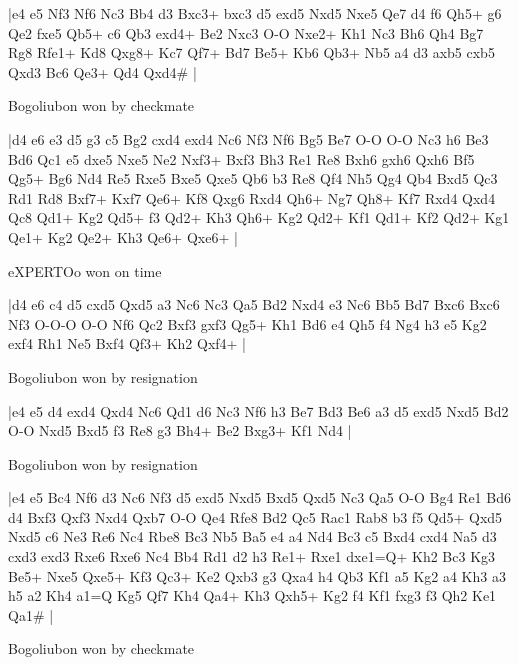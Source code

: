 \makegametitle
|e4 e5 Nf3 Nf6 Nc3 Bb4 d3 Bxc3+ bxc3 d5 exd5 Nxd5 Nxe5 Qe7 d4 f6 Qh5+ g6 Qe2 fxe5 Qb5+ c6 Qb3 exd4+ Be2 Nxc3 O-O Nxe2+ Kh1 Nc3 Bh6 Qh4 Bg7 Rg8 Rfe1+ Kd8 Qxg8+ Kc7 Qf7+ Bd7 Be5+ Kb6 Qb3+ Nb5 a4 d3 axb5 cxb5 Qxd3 Bc6 Qe3+ Qd4 Qxd4\#  |

\showboard

Bogoliubon won by checkmate

\makegametitle
|d4 e6 e3 d5 g3 c5 Bg2 cxd4 exd4 Nc6 Nf3 Nf6 Bg5 Be7 O-O O-O Nc3 h6 Be3 Bd6 Qc1 e5 dxe5 Nxe5 Ne2 Nxf3+ Bxf3 Bh3 Re1 Re8 Bxh6 gxh6 Qxh6 Bf5 Qg5+ Bg6 Nd4 Re5 Rxe5 Bxe5 Qxe5 Qb6 b3 Re8 Qf4 Nh5 Qg4 Qb4 Bxd5 Qc3 Rd1 Rd8 Bxf7+ Kxf7 Qe6+ Kf8 Qxg6 Rxd4 Qh6+ Ng7 Qh8+ Kf7 Rxd4 Qxd4 Qc8 Qd1+ Kg2 Qd5+ f3 Qd2+ Kh3 Qh6+ Kg2 Qd2+ Kf1 Qd1+ Kf2 Qd2+ Kg1 Qe1+ Kg2 Qe2+ Kh3 Qe6+ Qxe6+  |

\showboard

eXPERTOo won on time

\makegametitle
|d4 e6 c4 d5 cxd5 Qxd5 a3 Nc6 Nc3 Qa5 Bd2 Nxd4 e3 Nc6 Bb5 Bd7 Bxc6 Bxc6 Nf3 O-O-O O-O Nf6 Qc2 Bxf3 gxf3 Qg5+ Kh1 Bd6 e4 Qh5 f4 Ng4 h3 e5 Kg2 exf4 Rh1 Ne5 Bxf4 Qf3+ Kh2 Qxf4+  |

\showboard

Bogoliubon won by resignation

\makegametitle
|e4 e5 d4 exd4 Qxd4 Nc6 Qd1 d6 Nc3 Nf6 h3 Be7 Bd3 Be6 a3 d5 exd5 Nxd5 Bd2 O-O Nxd5 Bxd5 f3 Re8 g3 Bh4+ Be2 Bxg3+ Kf1 Nd4  |

\showboard

Bogoliubon won by resignation

\makegametitle
|e4 e5 Bc4 Nf6 d3 Nc6 Nf3 d5 exd5 Nxd5 Bxd5 Qxd5 Nc3 Qa5 O-O Bg4 Re1 Bd6 d4 Bxf3 Qxf3 Nxd4 Qxb7 O-O Qe4 Rfe8 Bd2 Qc5 Rac1 Rab8 b3 f5 Qd5+ Qxd5 Nxd5 c6 Ne3 Re6 Nc4 Rbe8 Bc3 Nb5 Ba5 e4 a4 Nd4 Bc3 c5 Bxd4 cxd4 Na5 d3 cxd3 exd3 Rxe6 Rxe6 Nc4 Bb4 Rd1 d2 h3 Re1+ Rxe1 dxe1=Q+ Kh2 Bc3 Kg3 Be5+ Nxe5 Qxe5+ Kf3 Qc3+ Ke2 Qxb3 g3 Qxa4 h4 Qb3 Kf1 a5 Kg2 a4 Kh3 a3 h5 a2 Kh4 a1=Q Kg5 Qf7 Kh4 Qa4+ Kh3 Qxh5+ Kg2 f4 Kf1 fxg3 f3 Qh2 Ke1 Qa1\#  |

\showboard

Bogoliubon won by checkmate


